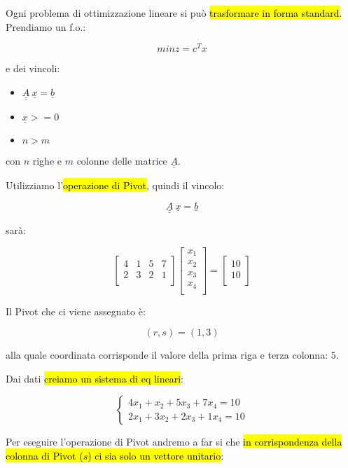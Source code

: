 Ogni problema di ottimizzazione lineare si può \hl{trasformare in forma standard}. Prendiamo un f.o.:

$$min z = c^T x$$

e dei vincoli:

\begin{itemize}
	\item $\underline{\underline{A}}\ \underline{x} = \underline{b}$
	\item $\underline{x} >= 0$
	\item $n > m$
\end{itemize}

con $n$ righe e $m$ colonne delle matrice $\underline{\underline{A}}$.

Utilizziamo l'\hl{operazione di Pivot}, quindi il vincolo:

$$\underline{\underline{A}}\ \underline{x} = \underline{b}$$

sarà:


$$
\left[ {\begin{array}{cccc}
	4 & 1 & 5 & 7 \\
	2 & 3 & 2 & 1 \\
\end{array} } \right]
\left[ {\begin{array}{c}
	x_1 \\
	x_2 \\
	x_3 \\
	x_4 \\
\end{array} } \right]
=
\left[ {\begin{array}{c}
	10 \\
	10 \\
\end{array} } \right]
$$

Il Pivot che ci viene assegnato è:

$$(r, s) = (1, 3)$$

alla quale coordinata corrisponde il valore della prima riga e terza colonna: $5$.

Dai dati \hl{creiamo un sistema di eq lineari}:

$$
\begin{cases} 
    4x_1 + x_2 + 5x_3 + 7x_4 = 10 \\ 
    2x_1 + 3x_2 + 2x_3 + 1x_4 = 10 
\end{cases}
$$

Per eseguire l'operazione di Pivot andremo a far si che \hl{in corrispondenza della colonna di Pivot ($s$) ci sia solo un vettore unitario}:

